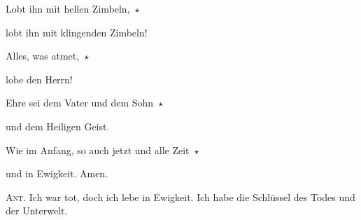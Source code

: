 \noindent Lobt ihn mit hellen Zimbeln,~$\star$~\nopagebreak

lobt ihn mit klingenden Zimbeln!

\noindent Alles, was atmet,~$\star$~\nopagebreak

lobe den Herrn!

\noindent Ehre sei dem Vater und dem Sohn~$\star$~\nopagebreak

und dem Heiligen Geist.

\noindent Wie im Anfang, so auch jetzt und alle Zeit~$\star$~\nopagebreak

und in Ewigkeit. Amen.

\vspace{10pt}

\noindent \textsc{Ant.} Ich war tot, doch ich lebe in Ewigkeit. Ich habe die Schlüssel des Todes und der Unterwelt.